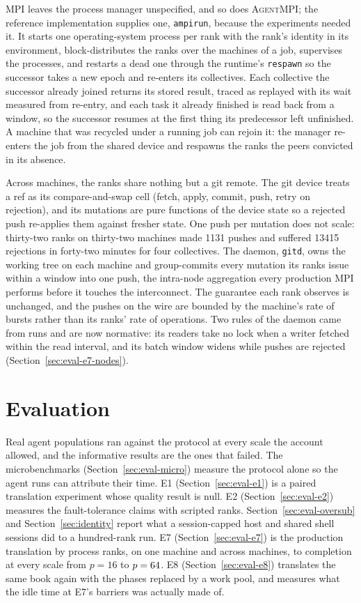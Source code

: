 \documentclass[sigconf,nonacm]{acmart}
\newcommand{\ampi}{\textsc{AgentMPI}\xspace}
\newcommand{\code}[1]{\texttt{\small #1}}
\begin{document}
MPI leaves the process manager unspecified, and so does \ampi; the reference
implementation supplies one, \code{ampirun}, because the experiments needed it.
It starts one operating-system process per rank with the rank's identity in its
environment, block-distributes the ranks over the machines of a job, supervises
the processes, and restarts a dead one through the runtime's \code{respawn} so
the successor takes a new epoch and re-enters its collectives. Each collective the
successor already joined returns its stored result, traced as replayed with its
wait measured from re-entry, and each task it already finished is read back from
a window, so the successor resumes at the first thing its predecessor left
unfinished. A machine that was recycled under a running job can rejoin it: the
manager re-enters the job from the shared device and respawns the ranks the peers
convicted in its absence.

Across machines, the ranks share nothing but a git remote. The git device treats
a ref as its compare-and-swap cell (fetch, apply, commit, push, retry on
rejection), and its mutations are pure functions of the device state so a
rejected push re-applies them against fresher state. One push per mutation does
not scale: thirty-two ranks on thirty-two machines made 1131 pushes and suffered
13415 rejections in forty-two minutes for four collectives. The daemon,
\code{gitd}, owns the working tree on each machine and group-commits every
mutation its ranks issue within a window into one push, the intra-node
aggregation every production MPI performs before it touches the interconnect.
The guarantee each rank observes is unchanged, and the pushes on the wire are
bounded by the machine's rate of bursts rather than its ranks' rate of
operations. Two rules of the daemon came from runs and are now normative: its
readers take no lock when a writer fetched within the read interval, and its
batch window widens while pushes are rejected (Section~\ref{sec:eval-e7-nodes}).

\section{Evaluation}
\label{sec:eval}

Real agent populations ran against the protocol at every scale the account
allowed, and the informative results are the ones that failed. The
microbenchmarks (Section~\ref{sec:eval-micro}) measure the protocol alone so the
agent runs can attribute their time. E1 (Section~\ref{sec:eval-e1}) is a paired
translation experiment whose quality result is null. E2
(Section~\ref{sec:eval-e2}) measures the fault-tolerance claims with scripted
ranks. Section~\ref{sec:eval-oversub} and Section~\ref{sec:identity} report what
a session-capped host and shared shell sessions did to a hundred-rank run. E7
(Section~\ref{sec:eval-e7}) is the production translation by process ranks, on
one machine and across machines, to completion at every scale from $p=16$ to
$p=64$. E8 (Section~\ref{sec:eval-e8}) translates the same book
again with the phases replaced by a work pool, and measures what the idle time
at E7's barriers was actually made of.
\end{document}
